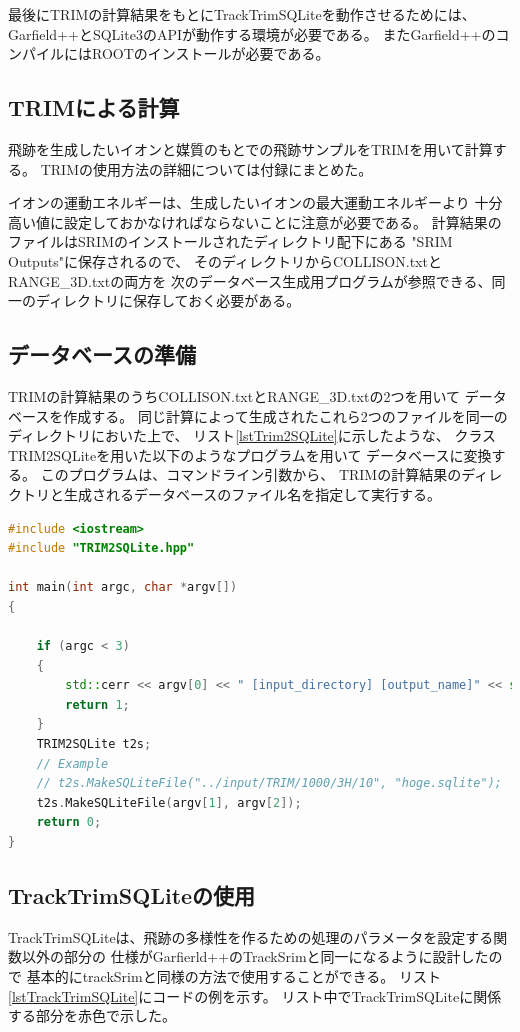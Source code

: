 \documentclass [11pt,a4paper,dvipdfmx] {jarticle}
\begin{document}
最後にTRIMの計算結果をもとにTrackTrimSQLiteを動作させるためには、
Garfield++とSQLite3のAPIが動作する環境が必要である。
またGarfield++のコンパイルにはROOTのインストールが必要である。

\subsection{TRIMによる計算}
飛跡を生成したいイオンと媒質のもとでの飛跡サンプルをTRIMを用いて計算する。
TRIMの使用方法の詳細については付録にまとめた。

イオンの運動エネルギーは、生成したいイオンの最大運動エネルギーより
十分高い値に設定しておかなければならないことに注意が必要である。
計算結果のファイルはSRIMのインストールされたディレクトリ配下にある
"SRIM Outputs"に保存されるので、
そのディレクトリからCOLLISON.txtとRANGE\_3D.txtの両方を
次のデータベース生成用プログラムが参照できる、同一のディレクトリに保存しておく必要がある。


\subsection{データベースの準備}
TRIMの計算結果のうちCOLLISON.txtとRANGE\_3D.txtの2つを用いて
データベースを作成する。
同じ計算によって生成されたこれら2つのファイルを同一のディレクトリにおいた上で、
リスト\ref{lstTrim2SQLite}に示したような、
クラスTRIM2SQLiteを用いた以下のようなプログラムを用いて
データベースに変換する。
このプログラムは、コマンドライン引数から、
TRIMの計算結果のディレクトリと生成されるデータベースのファイル名を指定して実行する。

\begin{lstlisting}[language=C++, caption=makdb.cpp (TRIMの計算結果をSQLiteのデータベースに変換するプログラム。),label=lstTrim2SQLite]
#include <iostream>
#include "TRIM2SQLite.hpp"

int main(int argc, char *argv[])
{

    if (argc < 3)
    {
        std::cerr << argv[0] << " [input_directory] [output_name]" << std::endl;
        return 1;
    }
    TRIM2SQLite t2s;
    // Example
    // t2s.MakeSQLiteFile("../input/TRIM/1000/3H/10", "hoge.sqlite");
    t2s.MakeSQLiteFile(argv[1], argv[2]);
    return 0;
}
\end{lstlisting}


\subsection{TrackTrimSQLiteの使用}
TrackTrimSQLiteは、飛跡の多様性を作るための処理のパラメータを設定する関数以外の部分の
仕様がGarfierld++のTrackSrimと同一になるように設計したので
基本的にtrackSrimと同様の方法で使用することができる。
リスト\ref{lstTrackTrimSQLite}にコードの例を示す。
リスト中でTrackTrimSQLiteに関係する部分を赤色で示した。
\end{document}
